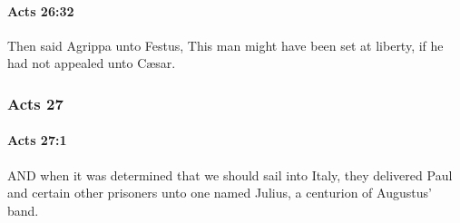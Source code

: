 		\paragraph{Acts 26:32} %
			\label{ACTS-26-32}

			Then said Agrippa unto Festus, This man might have been set at liberty, if he had not appealed unto Cæsar.

			\begin{framed}
			\scriptsize
				\begin{compactdesc}
					\item[SBLG] 
				\end{compactdesc}
			\end{framed}

	\subsubsection{Acts 27} %
		\label{ACTS-27}
		
		\paragraph{Acts 27:1} %
			\label{ACTS-27-1}

			AND when it was determined that we should sail into Italy, they delivered Paul and certain other prisoners unto one named Julius, a centurion of Augustus' band.

